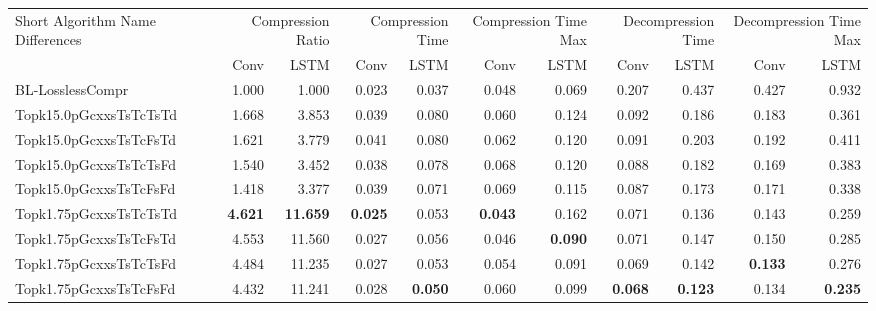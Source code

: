 \begin{tabular}{lrrrrrrrrrr}
\toprule
\multicolumn{1}{p{2.5cm}}{Short Algorithm Name Differences} & \multicolumn{2}{p{1.8cm}}{Compression Ratio} & \multicolumn{2}{p{1.8cm}}{Compression Time} & \multicolumn{2}{p{1.8cm}}{Compression Time Max} & \multicolumn{2}{p{1.8cm}}{Decompression Time} & \multicolumn{2}{p{1.8cm}}{Decompression Time Max} \\
 & Conv & LSTM & Conv & LSTM & Conv & LSTM & Conv & LSTM & Conv & LSTM \\
\midrule
BL-LosslessCompr & 1.000 & 1.000 & 0.023 & 0.037 & 0.048 & 0.069 & 0.207 & 0.437 & 0.427 & 0.932 \\
Topk15.0pGcxxsTsTcTsTd & 1.668 & 3.853 & 0.039 & 0.080 & 0.060 & 0.124 & 0.092 & 0.186 & 0.183 & 0.361 \\
Topk15.0pGcxxsTsTcFsTd & 1.621 & 3.779 & 0.041 & 0.080 & 0.062 & 0.120 & 0.091 & 0.203 & 0.192 & 0.411 \\
Topk15.0pGcxxsTsTcTsFd & 1.540 & 3.452 & 0.038 & 0.078 & 0.068 & 0.120 & 0.088 & 0.182 & 0.169 & 0.383 \\
Topk15.0pGcxxsTsTcFsFd & 1.418 & 3.377 & 0.039 & 0.071 & 0.069 & 0.115 & 0.087 & 0.173 & 0.171 & 0.338 \\
Topk1.75pGcxxsTsTcTsTd & \bfseries 4.621 & \bfseries 11.659 & \bfseries 0.025 & 0.053 & \bfseries 0.043 & 0.162 & 0.071 & 0.136 & 0.143 & 0.259 \\
Topk1.75pGcxxsTsTcFsTd & 4.553 & 11.560 & 0.027 & 0.056 & 0.046 & \bfseries 0.090 & 0.071 & 0.147 & 0.150 & 0.285 \\
Topk1.75pGcxxsTsTcTsFd & 4.484 & 11.235 & 0.027 & 0.053 & 0.054 & 0.091 & 0.069 & 0.142 & \bfseries 0.133 & 0.276 \\
Topk1.75pGcxxsTsTcFsFd & 4.432 & 11.241 & 0.028 & \bfseries 0.050 & 0.060 & 0.099 & \bfseries 0.068 & \bfseries 0.123 & 0.134 & \bfseries 0.235 \\
\bottomrule
\end{tabular}

